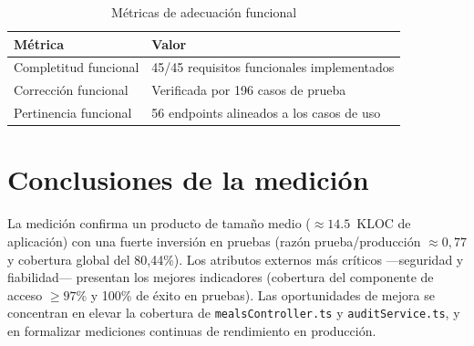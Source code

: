 \begin{table}[H]\centering
\caption{Métricas de adecuación funcional}\label{tab:m-adec}
\begin{tabularx}{\textwidth}{L{0.46\textwidth} X}
\toprule \textbf{Métrica} & \textbf{Valor} \\ \midrule
Completitud funcional & 45/45 requisitos funcionales implementados \\
Corrección funcional & Verificada por 196 casos de prueba \\
Pertinencia funcional & 56 endpoints alineados a los casos de uso \\
\bottomrule
\end{tabularx}
\end{table}

\section{Conclusiones de la medición}
La medición confirma un producto de tamaño medio ($\approx 14.5$~KLOC de aplicación)
con una fuerte inversión en pruebas (razón prueba/producción $\approx 0{,}77$ y
cobertura global del 80,44\%). Los atributos externos más críticos —seguridad y
fiabilidad— presentan los mejores indicadores (cobertura del componente de acceso
$\geq 97\%$ y 100\% de éxito en pruebas). Las oportunidades de mejora se concentran en
elevar la cobertura de \texttt{mealsController.ts} y \texttt{auditService.ts}, y en
formalizar mediciones continuas de rendimiento en producción.
